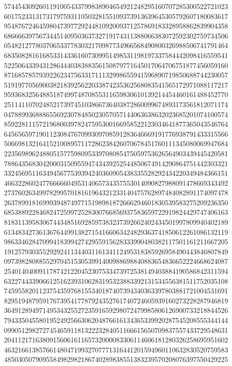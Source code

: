 {    5744543092601191005433799838904654921248295160707285300522721023 ~
    6017523313173179759311050328155109373913639645305792607180083617 ~
    9548767246459804739772924481092009371257869183328958862839904358 ~
    6866663975673445140950363732719174311388066383072592302759734506 ~
    0548212778037065337783032170987734966568490800326988506741791464 ~
    6835082816168533143361607309951498531198197337584442098416559541 ~
    5225064339431286444038388356150879771645017064706751877456059160 ~
    8716857857939226234756331711132998655941596890719850688744230057 ~
    5191977056900382183925622033874235362568083541565172971088117217 ~
    9593683256488518749974870855311659830610139214454460161488452770 ~
    2511411070248521739745103866736403872860099674893173561812071174 ~
    0478899368886556923078485023057057144063638632023685201074100574 ~
    8592281115721968003978247595300166958522123034641877365043546764 ~
    6456565971901123084767099309708591283646669191776938791433315566 ~
    5066981321641521008957117286238426070678451760111345080069947684 ~
    2235698962488051577598095339708085475059753626564903439445420581 ~
    7886435683042000315095594743439252544850674914290864751442303321 ~
    3324569511634945677539394240360905438335528292434220349484366151 ~
    4663228602477666660495314065734357553014090827988091478669343492 ~
    2737602634997829957018161964321233140475762897484082891174097478 ~
    2637899181699939487497715198981872666294601830539583275209236350 ~
    6853889228468247259972528300766856937583659722919824429747406163 ~
    8183113958306744348516928597383237392662402434501997809940402189 ~
    6134834273613676449913827154166063424829363741850612261086132119 ~
    9863346284709941839942742955915628333990480382117501161211667205 ~
    1912579303552929241134403116134112495318385926958490443846807849 ~
    0973982808855297045153053991400988698840883654836652224668624087 ~
    2540140400911787421220452307533473972538149403884190586842311594 ~
    6322744339066125162393106283195323883392131534556381511752035108 ~
    7459558201123754359768155340187407394340363397803881721004531691 ~
    8295194879591767395417787924352761740724605939160273228287946819 ~
    3649128949714953432552723591659298072479985806126900733218844526 ~
    7943350455801952492566306204876616134365339920287545208555344144 ~
    0990512982727454659118132223284051166615650709837557433729548631 ~
    2041121716380915606161165732000083306114606181280326258695951602 ~
    4632166138576614804719932707771316441201594960110632830520759583 ~
    4850305079095584982982186740289838551383239570208076397550429225 ~
}
